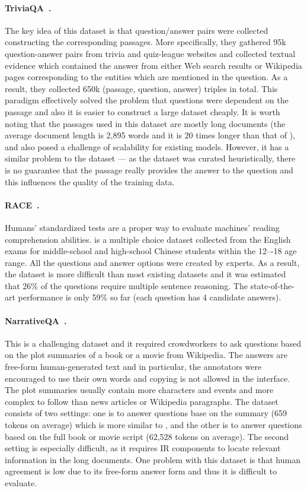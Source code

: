 \paragraph{TriviaQA~\cite{joshi2017triviaqa}.} The key idea of this dataset is that question/answer pairs were collected  constructing the corresponding passages. More specifically, they gathered 95k question-answer pairs from trivia and quiz-league websites and collected textual evidence which contained the answer from either Web search results or Wikipedia pages corresponding to the entities which are mentioned in the question. As a result, they collected 650k (passage, question, answer) triples in total. This paradigm effectively solved the problem that questions were dependent on the passage and also it is easier to construct a large dataset cheaply. It is worth noting that the passages used in this dataset are mostly long documents (the average document length is 2,895 words and it is 20 times longer than that of ), and also posed a challenge of scalability for existing models.  However, it has a similar problem to the  dataset --- as the dataset was curated heuristically, there is no guarantee that the passage really provides the answer to the question and this influences the quality of the training data.

\paragraph{RACE~\cite{lai2017race}.} Humans' standardized tests are a proper way to evaluate machines' reading comprehension abilities.  is a multiple choice dataset collected from the English exams for middle-school and high-school Chinese students within the 12–-18 age range. All the questions and answer options were created by experts. As a result, the dataset is more difficult than most existing datasets and it was estimated that 26\% of the questions require multiple sentence reasoning. The state-of-the-art performance is only 59\% so far (each question has 4 candidate answers).

\paragraph{NarrativeQA~\cite{kovcisky2018narrativeqa}.} This is a challenging dataset and it required crowdworkers to ask questions based on the plot summaries of a book or a movie from Wikipedia. The answers are free-form human-generated text and in particular, the annotators were encouraged to use their own words and copying is not allowed in the interface. The plot summaries usually contain more characters and events and more complex to follow than news articles or Wikipedia paragraphs. The dataset consists of two settings: one is to answer questions base on the summary (659 tokens on average) which is more similar to , and the other is to answer questions based on the full book or movie script (62,528 tokens on average). The second setting is especially difficult, as it requires IR components to locate relevant information in the long documents. One problem with this dataset is that human agreement is low due to its free-form answer form and thus it is difficult to evaluate.

